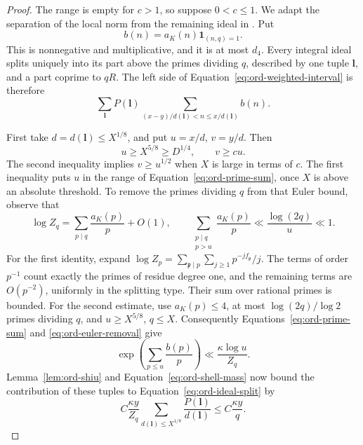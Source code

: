 \begin{proof}
The range is empty for \(c>1\), so suppose \(0<c\le1\).
We adapt the separation of the local norm from the remaining ideal
in \cite[Proposition~4.2]{PrimeDegreePackets}.  Put
\[
 b(n)=a_K(n)\mathbf 1_{(n,q)=1}.
\]
This is nonnegative and multiplicative, and it is at most \(d_4\).
Every integral ideal splits uniquely into its part above the primes
dividing \(q\), described by one tuple \(\boldsymbol l\), and a part
coprime to \(qR\).  The left side of
Equation~\eqref{eq:ord-weighted-interval} is therefore
\begin{equation}\label{eq:ord-ideal-split}
 \sum_{\boldsymbol l}P(\boldsymbol l)
       \sum_{(x-y)/d(\boldsymbol l)<n\le x/d(\boldsymbol l)}b(n).
\end{equation}

First take \(d=d(\boldsymbol l)\le X^{1/8}\), and put \(u=x/d\),
\(v=y/d\).  Then
\[
 u\ge X^{5/8}\ge D^{1/4},\qquad v\ge cu.
\]
The second inequality implies \(v\ge u^{1/2}\) when \(X\) is large
in terms of \(c\).  The first inequality puts \(u\) in the range of
Equation~\eqref{eq:ord-prime-sum}, once \(X\) is above an absolute
threshold.  To remove the primes dividing \(q\) from that Euler bound,
observe that
\begin{equation}\label{eq:ord-euler-removal}
 \log Z_q=\sum_{p\mid q}\frac{a_K(p)}p+O(1),\qquad
 \sum_{\substack{p\mid q\\p>u}}\frac{a_K(p)}p
       \ll\frac{\log(2q)}u\ll1 .
\end{equation}
For the first identity, expand
\(\log Z_p=\sum_{\mathfrak p\mid p}\sum_{j\ge1}p^{-jf_{\mathfrak p}}/j\).
The terms of order \(p^{-1}\) count exactly the primes of residue
degree one, and the remaining terms are \(O(p^{-2})\), uniformly
in the splitting type.  Their sum over rational primes is bounded.
For the second estimate, use \(a_K(p)\le4\), at most
\(\log(2q)/\log2\) primes dividing \(q\), and
\(u\ge X^{5/8}\), \(q\le X\).
Consequently Equations~\eqref{eq:ord-prime-sum} and
\eqref{eq:ord-euler-removal} give
\[
 \exp\left(\sum_{p\le u}\frac{b(p)}p\right)
       \ll \frac{\kappa\log u}{Z_q}.
\]
Lemma~\ref{lem:ord-shiu} and
Equation~\eqref{eq:ord-shell-mass} now bound the contribution of
these tuples to Equation~\eqref{eq:ord-ideal-split} by
\[
 C\frac{\kappa y}{Z_q}
       \sum_{d(\boldsymbol l)\le X^{1/8}}
             \frac{P(\boldsymbol l)}{d(\boldsymbol l)}
 \le C\frac{\kappa y}{q}.
\]


\end{proof}
